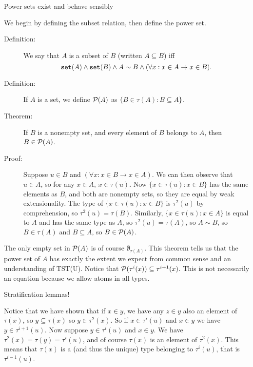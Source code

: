\documentclass{slides}
\begin{document}
\begin{slide}

{\Large Power sets exist and behave sensibly}

We begin by defining the subset relation, then define the power set.

\begin{description}

\item[Definition:]  We say that $A$ is a subset of $B$ (written $A \subseteq B$) iff $${\tt set}(A) \wedge {\tt set}(B) \wedge A \sim B \wedge (\forall x:x \in A \rightarrow x \in B).$$

\item[Definition:]  If $A$ is a set, we define ${\cal P}(A)$ as $\{B \in \tau(A):B \subseteq A\}$.

\item[Theorem:]  If $B$ is a nonempty set, and every element of $B$ belongs to $A$, then $B \in {\cal P}(A)$.

\item[Proof:]  Suppose $u \in B$ and $(\forall x:x \in B \rightarrow x \in A)$.  We can then observe that $u \in A$, so for any $x \in A$, $x \in \tau(u)$.  Now
\newline $\{x \in \tau(u):x \in B\}$ has the same elements as $B$, and both are nonempty sets, so they are equal by weak extensionality.  The type of $\{x \in \tau(u):x \in B\}$ is $\tau^2(u)$
by comprehension, so $\tau^2(u) = \tau(B)$.  Similarly, $\{x \in \tau(u):x \in A\}$ is equal to $A$ and has the same type as $A$, so $\tau^2(u) = \tau(A)$, so $A \sim B$, so $B \in \tau(A)$ and $B \subseteq A$, so $B \in {\cal P}(A)$.

\end{description}

The only empty set in ${\cal P}(A)$ is of course $\emptyset_{\tau(A)}$.  This theorem tells us that the power set
of $A$ has exactly the extent we expect from common sense and an understanding of TST(U).  Notice that ${\cal P}(\tau^i(x)) \subseteq \tau^{i+1}(x)$.  This is not necessarily an equation because we allow atoms in all types.

\end{slide}

\begin{slide}

{\Large Stratification lemmas!}

Notice that we have shown that if $x \in y$, we have any $z \in y$ also an element of $\tau(x)$, so $y \subseteq \tau(x)$ so $y \in \tau^2(x)$.  So if $x \in \tau^i(u)$ and $x \in y$ we have $y \in \tau^{i+1}(u)$.
Now suppose $y \in \tau^i(u)$ and $x \in y$.  We have $\tau^2(x) = \tau(y) = \tau^i(u)$, and of course $\tau(x)$ is an element of $\tau^2(x)$.  This means that $\tau(x)$ is a (and thus the unique) type belonging to $\tau^i(u)$, that is $\tau^{i-1}(u)$.

\end{slide}
\end{document}
